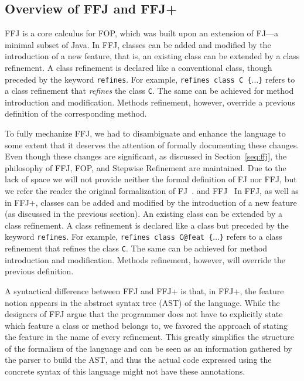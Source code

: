 
\subsection{Overview of \ac{FFJ} and \ac{FFJ+}}\label{seq:offj}

\acf{FFJ} is a core calculus for \acf{FOP}, which was built 
upon an extension of \acf{FJ}---a minimal subset of Java. 
In \ac{FFJ}, classes can be added and modified by the 
introduction of a new feature, that is, 
an existing class can be extended by a class refinement. 
A class refinement is declared like a conventional class, though 
preceded by the keyword \texttt{refines}. For example, 
\texttt{refines class C \{$\dots$\}} refers to a class
refinement that
\emph{refines} the class \texttt{C}. The same can be achieved 
for method introduction and modification. Methods refinement,
however, override a previous definition of the corresponding 
method.
 
To fully mechanize \ac{FFJ}, we had to disambiguate and enhance 
the language to some extent that it  deserves the attention of 
formally documenting these changes. 
Even though these changes are significant, as discussed in Section~\ref{seq:ffj}, 
the philosophy of \ac{FFJ}, \ac{FOP}, and Stepwise Refinement are maintained.
Due to the lack of space we will not provide neither the formal definition 
of \ac{FJ} nor \ac{FFJ}, but we refer the reader the original formalization of \ac{FJ}~\cite{igarashi_featherweight_2001}.
 and \ac{FFJ}~\cite{apel_feature_2008}
In \ac{FFJ}, as well as in \ac{FFJ+}, classes can be added and 
modified by the introduction of a new feature (as discussed in the previous section).
An existing class can be extended by a class refinement. A class refinement is declared like a class but
preceded by the keyword \texttt{refines}. For example, \texttt{refines class C@feat \{$\dots$\}} refers to a class refinement that
refines the class \texttt{C}. The same can be achieved for method introduction and modification. Methods refinement,
however, will override the previous definition.

A syntactical difference between \ac{FFJ} and \ac{FFJ+} is that, in \ac{FFJ+}, 
the feature notion appears in the abstract syntax tree (AST) of the language.
While the designers of \ac{FFJ} argue that the programmer does not have 
to explicitly state which feature a class or method belongs to, 
we favored the approach of stating the feature in the name of every refinement.
This greatly simplifies the structure of the formalism of the language and can be 
seen as an information gathered by the parser to build the AST, and thus 
the actual code expressed using the concrete syntax of this language 
might not have these annotations.

